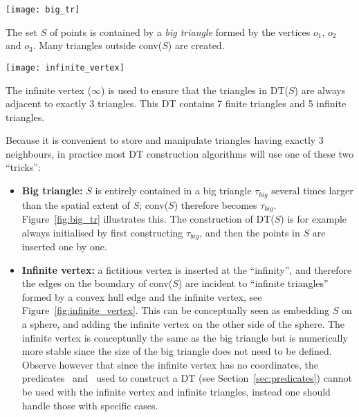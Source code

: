 \begin{marginfigure}
  \centering
  \texttt{[image: big\_tr]}
  \caption[The big triangle containing all the dataset.]{The set $S$ of points is contained by a \emph{big triangle} formed by the vertices $o_1$, $o_2$ and $o_3$. Many triangles outside conv($S$) are created.}%
\label{fig:big_tr}
\end{marginfigure}
\begin{marginfigure}
  \centering
  \texttt{[image: infinite\_vertex]}
  \caption[The infinite vertex.]{The infinite vertex ($\infty$) is used to ensure that the triangles in DT($S$) are always adjacent to exactly 3 triangles. This DT contains 7 finite triangles and 5 infinite triangles.}%
\label{fig:infinite_vertex}
\end{marginfigure}
Because it is convenient to store and manipulate triangles having exactly 3 neighbours, in practice most DT construction algorithms will use one of these two ``tricks'':
\begin{itemize}
  \item \textbf{Big triangle:} $S$ is entirely contained in a big triangle $\tau_{big}$ several times larger than the spatial extent of $S$; conv($S$) therefore becomes $\tau_{big}$. 
  Figure~\ref{fig:big_tr} illustrates this.
  The construction of DT($S$) is for example always initialised by first constructing $\tau_{big}$, and then the points in $S$ are inserted one by one. 
  \item \textbf{Infinite vertex:} a fictitious vertex is inserted at the ``infinity'', and therefore the edges on the boundary of conv($S$) are incident to ``infinite triangles'' formed by a convex hull edge and the infinite vertex, see Figure~\ref{fig:infinite_vertex}.
  This can be conceptually seen as embedding $S$ on a sphere, and adding the infinite vertex on the other side of the sphere.
  The infinite vertex is conceptually the same as the big triangle but is numerically more stable since the size of the big triangle does not need to be defined.
  Observe however that since the infinite vertex has no coordinates, the predicates \Orient\ and \Incircle\ used to construct a DT (see Section~\ref{sec:predicates}) cannot be used with the infinite vertex and infinite triangles, instead one should handle those with specific cases.
\end{itemize}

%


